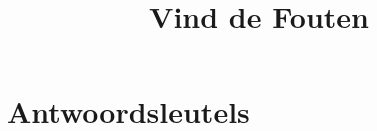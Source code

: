 \documentclass[12pt,a4paper]{article}
\title{Vind de Fouten}
\author{}
\date{}
\newif\ifshowopgave
\newif\ifshowoplossing
\begin{document}
\maketitle

\showopgavetrue
\showoplossingfalse


\clearpage
\appendix

\section*{Antwoordsleutels}
\showopgavefalse
\showoplossingtrue

\end{document}

